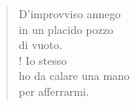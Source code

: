 
\begin{verse}
    D'improvviso annego\\
    in un placido pozzo\\
    di vuoto.\\!
    Io stesso\\
    ho da calare una mano\\
    per afferrarmi.
\end{verse}
